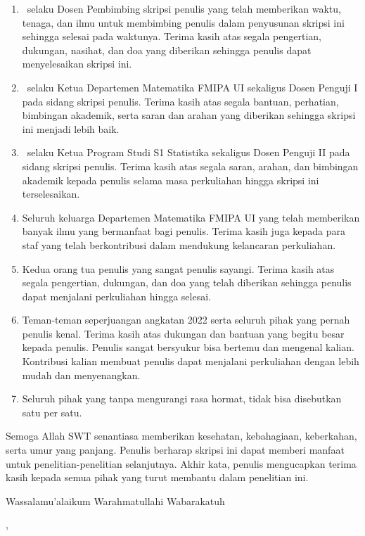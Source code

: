 \begin{enumerate}
    \item \pembimbinga\ selaku Dosen Pembimbing skripsi penulis yang telah memberikan waktu, tenaga, dan ilmu untuk membimbing penulis dalam penyusunan skripsi ini sehingga selesai pada waktunya. Terima kasih atas segala pengertian, dukungan, nasihat, dan doa yang diberikan sehingga penulis dapat menyelesaikan skripsi ini.\vspace*{-0.2cm}
    \item \pengujia\ selaku Ketua Departemen Matematika FMIPA UI sekaligus Dosen Penguji I pada sidang skripsi penulis. Terima kasih atas segala bantuan, perhatian, bimbingan akademik, serta saran dan arahan yang diberikan sehingga skripsi ini menjadi lebih baik.\vspace*{-0.2cm}
    \item \pengujib\ selaku Ketua Program Studi S1 Statistika sekaligus Dosen Penguji II pada sidang skripsi penulis. Terima kasih atas segala saran, arahan, dan bimbingan akademik kepada penulis selama masa perkuliahan hingga skripsi ini terselesaikan.\vspace*{-0.2cm}
    \item Seluruh keluarga Departemen Matematika FMIPA UI yang telah memberikan banyak ilmu yang bermanfaat bagi penulis. Terima kasih juga kepada para staf yang telah berkontribusi dalam mendukung kelancaran perkuliahan.\vspace*{-0.2cm}
    \item Kedua orang tua penulis yang sangat penulis sayangi. Terima kasih atas segala pengertian, dukungan, dan doa yang telah diberikan sehingga penulis dapat menjalani perkuliahan hingga selesai.\vspace*{-0.2cm}
    \item Teman-teman seperjuangan angkatan 2022 serta seluruh pihak yang pernah penulis kenal. Terima kasih atas dukungan dan bantuan yang begitu besar kepada penulis. Penulis sangat bersyukur bisa bertemu dan mengenal kalian. Kontribusi kalian membuat penulis dapat menjalani perkuliahan dengan lebih mudah dan menyenangkan.\vspace*{-0.2cm}
    \item Seluruh pihak yang tanpa mengurangi rasa hormat, tidak bisa disebutkan satu per satu.\vspace*{-0.2cm}
\end{enumerate}

Semoga Allah SWT senantiasa memberikan kesehatan, kebahagiaan, keberkahan, serta umur yang panjang. Penulis berharap skripsi ini dapat memberi manfaat untuk penelitian-penelitian selanjutnya. Akhir kata, penulis mengucapkan terima kasih kepada semua pihak yang turut membantu dalam penelitian ini.

\vspace*{0.3cm}
\noindent Wassalamu'alaikum Warahmatullahi Wabarakatuh

\vspace*{0.5cm}

\begin{flushleft}
\kota, \tanggalPengesahan\\ %
\penulis %
\end{flushleft} 